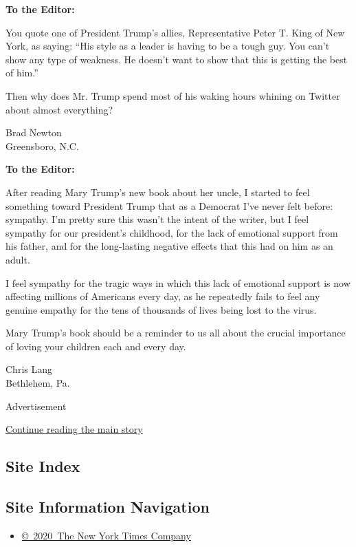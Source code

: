 \textbf{To the Editor:}

You quote one of President Trump's allies, Representative Peter T. King
of New York, as saying: ``His style as a leader is having to be a tough
guy. You can't show any type of weakness. He doesn't want to show that
this is getting the best of him.''

Then why does Mr. Trump spend most of his waking hours whining on
Twitter about almost everything?

Brad Newton\\
Greensboro, N.C.

\textbf{To the Editor:}

After reading Mary Trump's new book about her uncle, I started to feel
something toward President Trump that as a Democrat I've never felt
before: sympathy. I'm pretty sure this wasn't the intent of the writer,
but I feel sympathy for our president's childhood, for the lack of
emotional support from his father, and for the long-lasting negative
effects that this had on him as an adult.

I feel sympathy for the tragic ways in which this lack of emotional
support is now affecting millions of Americans every day, as he
repeatedly fails to feel any genuine empathy for the tens of thousands
of lives being lost to the virus.

Mary Trump's book should be a reminder to us all about the crucial
importance of loving your children each and every day.

Chris Lang\\
Bethlehem, Pa.

Advertisement

\protect\hyperlink{after-bottom}{Continue reading the main story}

\hypertarget{site-index}{%
\subsection{Site Index}\label{site-index}}

\hypertarget{site-information-navigation}{%
\subsection{Site Information
Navigation}\label{site-information-navigation}}

\begin{itemize}
\tightlist
\item
  \href{https://help.nytimes.com/hc/en-us/articles/115014792127-Copyright-notice}{©~2020~The
  New York Times Company}
\end{itemize}

